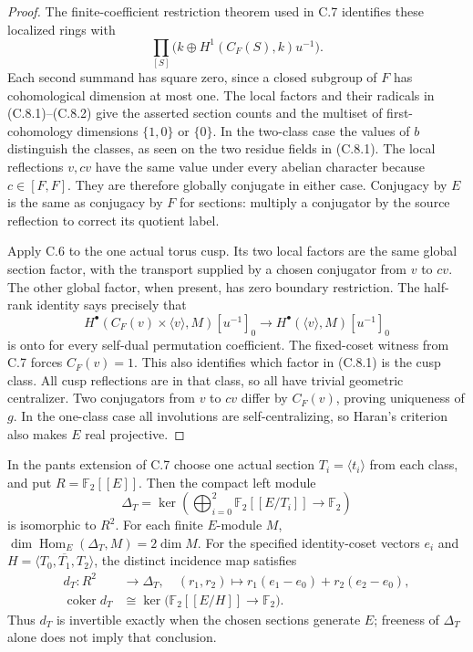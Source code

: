 \begin{proof}
The finite-coefficient restriction theorem used in
C.7 identifies these localized rings with
\[
 \prod_{[S]}\bigl(k\oplus H^1(C_F(S),k)u^{-1}\bigr).        \tag{C.8.2}
\]
Each second summand has square zero, since a closed
subgroup of $F$ has cohomological dimension at most
one.  The local factors and their radicals in
(C.8.1)--(C.8.2) give the asserted section counts
and the multiset of first-cohomology dimensions
$\{1,0\}$ or $\{0\}$.  In the two-class case the
values of $b$ distinguish the classes, as seen
on the two residue fields in (C.8.1).  The local
reflections $v,cv$ have the same value under every
abelian character because $c\in[F,F]$.  They are
therefore globally conjugate in either case.
Conjugacy by $E$ is the same as conjugacy by $F$
for sections: multiply a conjugator by the source
reflection to correct its quotient label.

Apply C.6 to the one actual torus cusp.  Its two
local factors are the same global section factor,
with the transport supplied by a chosen conjugator
from $v$ to $cv$.  The other global factor, when
present, has zero boundary restriction.  The
half-rank identity says precisely that
\[
 H^\bullet(C_F(v)\times\langle v\rangle,M)[u^{-1}]_0
        \longrightarrow H^\bullet(\langle v\rangle,M)[u^{-1}]_0
\]
is onto for every self-dual permutation coefficient.
The fixed-coset witness from C.7 forces $C_F(v)=1$.
This also identifies which factor in (C.8.1) is
the cusp class.  All cusp reflections are in that
class, so all have trivial geometric centralizer.
Two conjugators from $v$ to $cv$ differ by
$C_F(v)$, proving uniqueness of $g$.  In the
one-class case all involutions are self-centralizing,
so Haran's criterion also makes $E$ real projective.
\end{proof}

In the pants extension of C.7 choose one actual section
$T_i=\langle t_i\rangle$ from each class, and put
$R=\mathbb F_2[[E]]$.  Then the compact left module
\[
 \Delta_T=\ker\left(\bigoplus_{i=0}^2
                 \mathbb F_2[[E/T_i]]\longrightarrow\mathbb F_2\right)
\]
is isomorphic to $R^2$.  For each finite $E$-module $M$,
$\dim\operatorname{Hom}_E(\Delta_T,M)=2\dim M$.
For the specified identity-coset vectors $e_i$ and
$H=\overline{\langle T_0,T_1,T_2\rangle}$, the distinct
incidence map satisfies
\[
 \begin{split}
 d_T:R^2&\longrightarrow\Delta_T,
   \quad(r_1,r_2)\longmapsto r_1(e_1-e_0)+r_2(e_2-e_0),\\
 \operatorname{coker}d_T&\cong
       \ker\bigl(\mathbb F_2[[E/H]]\longrightarrow\mathbb F_2\bigr).
 \end{split}                                                  \tag{C.9.1}
\]
Thus $d_T$ is invertible exactly when the chosen sections
generate $E$; freeness of $\Delta_T$ alone does not imply
that conclusion.

